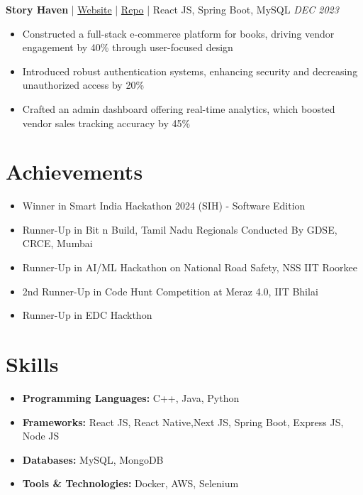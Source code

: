 \documentclass[10pt, letterpaper]{article}
\newenvironment{resumePoints}{
    \begin{itemize}[leftmargin=*,nosep,noitemsep,topsep=2pt,parsep=0pt]
}{\end{itemize}}
\begin{document}
\vspace{0.15cm}

\textbf{Story Haven} | \href{https://storyhaven.netlify.app/}{Website} | \href{https://github.com/vignesh2004vasu/StoryHaven}{Repo} | React JS, Spring Boot, MySQL \hfill \textit{DEC 2023}
\begin{resumePoints}
    \item Constructed a full-stack e-commerce platform for books, driving vendor engagement by 40\% through user-focused design
    \item Introduced robust authentication systems, enhancing security and decreasing unauthorized access by 20\%
        \item Crafted an admin dashboard offering real-time analytics, which boosted vendor sales tracking accuracy by 45\%

\end{resumePoints}



\vspace{-0.1cm}
\section{Achievements}
\vspace{-0.2cm}
\begin{resumePoints}
    \item Winner in Smart India Hackathon 2024 (SIH) - Software Edition
    \item Runner-Up in Bit n Build, Tamil Nadu Regionals Conducted By GDSE, CRCE, Mumbai
    \item Runner-Up in AI/ML Hackathon on National Road Safety, NSS IIT Roorkee
    \item 2nd Runner-Up in Code Hunt Competition at Meraz 4.0, IIT Bhilai
    \item Runner-Up in EDC Hackthon
\end{resumePoints}

\vspace{-0.1cm}
\section{Skills}
\vspace{-0.2cm}
\begin{resumePoints}
    \item \textbf{Programming Languages:} C++, Java, Python
    \item \textbf{Frameworks:} React JS, React Native,Next JS, Spring Boot, Express JS, Node JS
    \item \textbf{Databases:} MySQL, MongoDB
    \item \textbf{Tools \& Technologies:} Docker, AWS, Selenium
\end{resumePoints}
\end{document}
